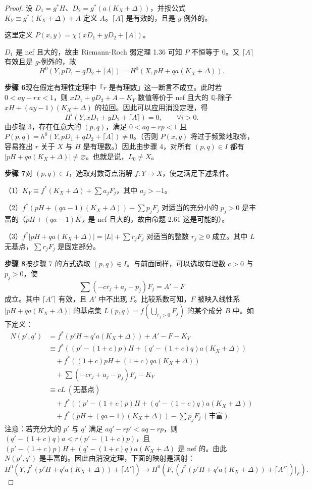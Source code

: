 \begin{proof}
设 $D_1=g^*H$、$D_2=g^*(a(K_X+\Delta))$，并按公式 $K_Y\equiv g^*(K_X+\Delta)+A$ 定义 $A$。$\lceil A\rceil$ 是有效的，且是 $g$-例外的。

这里定义 $P(x,y)=\chi(xD_1+yD_2+\lceil A\rceil)$。

$D_1$ 是 nef 且大的，故由 Riemann-Roch 弱定理 1.36 可知 $P$ 不恒等于 $0$。又 $\lceil A\rceil$ 有效且是 $g$-例外的，故
\[
H^0(Y,pD_1+qD_2+\lceil A\rceil)=H^0(X,pH+qa(K_X+\Delta)).
\]

\par\medskip\noindent\textbf{步骤 6}\quad 现在假定有理性定理中「$r$ 是有理数」这一断言不成立。此时若 $0<ay-rx<1$，则 $xD_1+yD_2+A-K_Y$ 数值等价于 nef 且大的 $\mathbb{Q}$-除子 $xH+(ay-1)(K_X+\Delta)$ 的拉回。因此可以应用消没定理，得
\[
H^i(Y,xD_1+yD_2+\lceil A\rceil)=0,\qquad\forall i>0.
\]
由步骤 3，存在任意大的 $(p,q)$，满足 $0<aq-rp<1$ 且 $P(p,q)=h^0(Y,pD_1+qD_2+\lceil A\rceil)\neq 0$。（否则 $P(x,y)$ 将过于频繁地取零，容易推出 $r$ 关于 $X$ 与 $H$ 是有理数。）因此由步骤 4，对所有 $(p,q)\in I$ 都有 $|pH+qa(K_X+\Delta)|\neq\varnothing$。也就是说，$L_0\neq X$。

\par\medskip\noindent\textbf{步骤 7}\quad 对 $(p,q)\in I$，选取对数奇点消解 $f:Y\to X$，使之满足下述条件。

（1）$K_Y\equiv f^*(K_X+\Delta)+\sum a_jF_j$，其中 $a_j>-1$。

（2）$f^*(pH+(qa-1)(K_X+\Delta))-\sum p_jF_j$ 对适当的充分小的 $p_j>0$ 是丰富的（$pH+(qa-1)K_X$ 是 nef 且大的，故由命题 2.61 这是可能的）。

（3）$f^*|pH+qa(K_X+\Delta)|=|L|+\sum r_jF_j$ 对适当的整数 $r_j\geq 0$ 成立。其中 $L$ 无基点，$\sum r_jF_j$ 是固定部分。

\par\medskip\noindent\textbf{步骤 8}\quad 按步骤 7 的方式选取 $(p,q)\in I$。与前面同样，可以选取有理数 $c>0$ 与 $p_j>0$，使
\[
\sum(-cr_j+a_j-p_j)F_j=A'-F
\]
成立。其中 $\lceil A'\rceil$ 有效，且 $A'$ 中不出现 $F$。比较系数可知，$F$ 被映入线性系 $|pH+qa(K_X+\Delta)|$ 的基点集 $L(p,q)=f(\bigcup_{r_j>0}F_j)$ 的某个成分 $B$ 中。如下定义：
\[
\begin{aligned}
N(p',q')&=f^*(p'H+q'a(K_X+\Delta))+A'-F-K_Y\\
&\equiv f^*\left((p'-(1+c)p)H+(q'-(1+c)q)a(K_X+\Delta)\right)\\
&\quad+f^*\left((1+c)pH+(1+c)qa(K_X+\Delta)\right)\\
&\quad+\sum(-cr_j+a_j-p_j)F_j-K_Y\\
&\equiv cL\ (\text{无基点})\\
&\quad+f^*\left((p'-(1+c)p)H+(q'-(1+c)q)a(K_X+\Delta)\right)\\
&\quad+f^*\left(pH+(qa-1)(K_X+\Delta)\right)-\sum p_jF_j\ (\text{丰富}).
\end{aligned}
\]
注意：若充分大的 $p'$ 与 $q'$ 满足 $aq'-rp'<aq-rp$，则 $(q'-(1+c)q)a<r(p'-(1+c)p)$，且 $(p'-(1+c)p)H+(q'-(1+c)q)a(K_X+\Delta)$ 是 nef 的。由此 $N(p',q')$ 是丰富的。因此由消没定理，下面的映射是满射：
\[
H^0\left(Y,f^*(p'H+q'a(K_X+\Delta))+\lceil A'\rceil\right)\to H^0\left(F,(f^*(p'H+q'a(K_X+\Delta))+\lceil A'\rceil)|_F\right).
\]


\end{proof}
